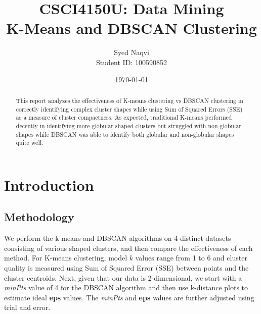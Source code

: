 \documentclass{article}
\title{\textbf{CSCI4150U: Data Mining}\\K-Means and DBSCAN Clustering}
\author{Syed Naqvi \\ Student ID: 100590852}
\date{\today}
\begin{document}
\maketitle

\begin{abstract}
This report analyzes the effectiveness of K-means clustering vs DBSCAN clustering in correctly identifying complex cluster shapes while
using Sum of Squared Errors (SSE) as a measure of cluster compactness. As expected, traditional K-means performed decently in identifying
more globular shaped clusters but struggled with non-globular shapes while DBSCAN was able to identify both globular and non-globular
shapes quite well.
\end{abstract}
    
    

\section{Introduction}

\subsection{Methodology}
We perform the k-means and DBSCAN algorithms on 4 distinct datasets consisting of various shaped clusters, and then compare the effectiveness
of each method. For K-means clustering, model \( k \) values range from 1 to 6 and cluster quality is measured using Sum of Squared Error (SSE)
between points and the cluster centroids. Next, given that our data is 2-dimensional, we start with a \textit{minPts} value of 4 for the
DBSCAN algorithm and then use k-distance plots to estimate ideal \textbf{eps} values. The \textit{minPts} and \textbf{eps} values are further
adjusted using trial and error.
\end{document}
